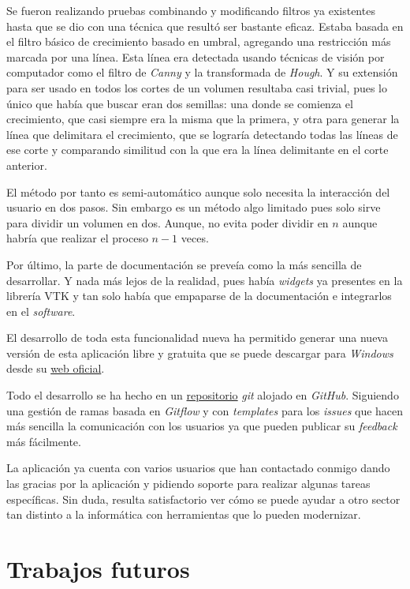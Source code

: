 Se fueron realizando pruebas combinando y modificando filtros ya existentes hasta que se dio con una técnica que resultó ser bastante eficaz. Estaba basada en el filtro básico de crecimiento basado en umbral, agregando una restricción más marcada por una línea. Esta línea era detectada usando técnicas de visión por computador como el filtro de \textit{Canny} y la transformada de \textit{Hough}. Y su extensión para ser usado en todos los cortes de un volumen resultaba casi trivial, pues lo único que había que buscar eran dos semillas: una donde se comienza el crecimiento, que casi siempre era la misma que la primera, y otra para generar la línea que delimitara el crecimiento, que se lograría detectando todas las líneas de ese corte y comparando similitud con la que era la línea delimitante en el corte anterior.

El método por tanto es semi-automático aunque solo necesita la interacción del usuario en dos pasos. Sin embargo es un método algo limitado pues solo sirve para dividir un volumen en dos. Aunque, no evita poder dividir en $n$ aunque habría que realizar el proceso $n-1$ veces.

Por último, la parte de documentación se preveía como la más sencilla de desarrollar. Y nada más lejos de la realidad, pues había \textit{widgets} ya presentes en la librería VTK y tan solo había que empaparse de la documentación e integrarlos en el \textit{software}.

El desarrollo de toda esta funcionalidad nueva ha permitido generar una nueva versión de esta aplicación libre y gratuita que se puede descargar para \textit{Windows} desde su \href{https://fblupi.github.io/3DCurator/es/}{web oficial}.

Todo el desarrollo se ha hecho en un \href{https://github.com/fblupi/3DCurator}{repositorio} \textit{git} alojado en \textit{GitHub}. Siguiendo una gestión de ramas basada en \textit{Gitflow} y con \textit{templates} para los \textit{issues} que hacen más sencilla la comunicación con los usuarios ya que pueden publicar su \textit{feedback} más fácilmente.

La aplicación ya cuenta con varios usuarios que han contactado conmigo dando las gracias por la aplicación y pidiendo soporte para realizar algunas tareas específicas. Sin duda, resulta satisfactorio ver cómo se puede ayudar a otro sector tan distinto a la informática con herramientas que lo pueden modernizar.

\section{Trabajos futuros}

